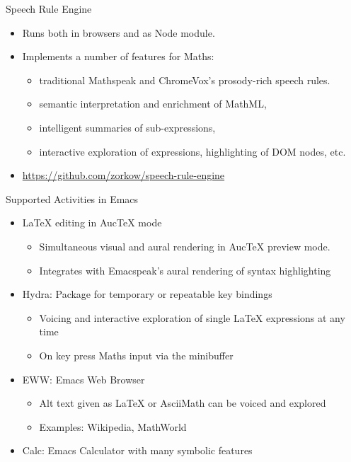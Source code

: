 \documentclass[final,hyperref={pdfpagelabels=false}]{beamer}
\begin{document}
\begin{frame}{}
\begin{columns}[t]
\begin{column}{.32\linewidth}
\begin{block}{\Large Speech Rule Engine}
\begin{itemize}
        \item Runs both in browsers and as Node module.
        \item Implements a number of features for Maths:
          \begin{itemize}
          \item traditional Mathspeak and ChromeVox's prosody-rich speech rules.
          \item semantic interpretation and enrichment of MathML,
          \item intelligent summaries of sub-expressions,
          \item interactive exploration of expressions, highlighting of DOM
            nodes, etc.
          \end{itemize}
        \item \textcolor{red}{\url{https://github.com/zorkow/speech-rule-engine}}
        \end{itemize}
      \end{block}
      \begin{block}{\Large Supported Activities in Emacs}
        \begin{itemize}
        \item {\LaTeX} editing in AucTeX mode
          \begin{itemize}
          \item Simultaneous visual and aural rendering in AucTeX preview mode.
          \item Integrates with Emacspeak's aural rendering of syntax highlighting
          \end{itemize}
        \item Hydra: Package for temporary or repeatable key bindings
          \begin{itemize}
          \item Voicing and interactive exploration of single {\LaTeX}
            expressions at any time
          \item On key press Maths input via the minibuffer
          \end{itemize}
        \item EWW: Emacs Web Browser
          \begin{itemize}
          \item Alt text given as {\LaTeX} or AsciiMath can be voiced and explored
          \item Examples: Wikipedia, MathWorld
          \end{itemize}
        \item Calc: Emacs Calculator with many symbolic features

\end{itemize}
\end{block}
\end{column}
\end{columns}
\end{frame}
\end{document}
